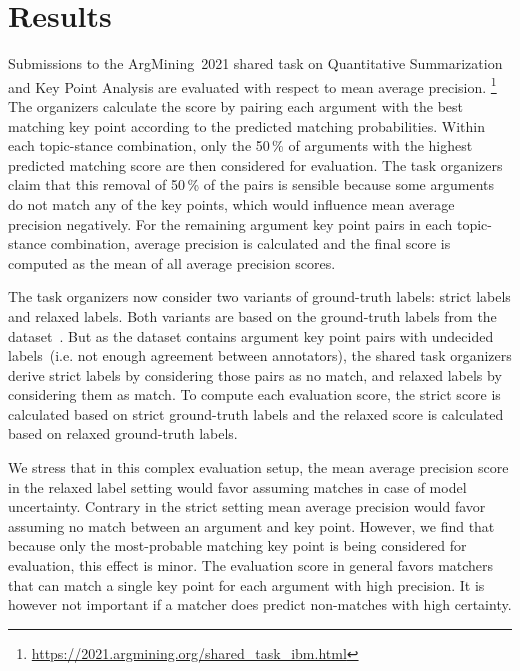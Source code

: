 \section{Results}\label{results}


Submissions to the ArgMining~2021 shared task on Quantitative Summarization and Key Point Analysis are evaluated with respect to mean average precision.%
\footnote{\url{https://2021.argmining.org/shared_task_ibm.html}}
The organizers calculate the score by pairing each argument with the best matching key point according to the predicted matching probabilities.
Within each topic-stance combination, only the 50\,\% of arguments with the highest predicted matching score are then considered for evaluation.
The task organizers claim that this removal of 50\,\% of the pairs is sensible because some arguments do not match any of the key points, which would influence mean average precision negatively. %
For the remaining argument key point pairs in each topic-stance combination, average precision is calculated and the final score is computed as the mean of all average precision scores.

The task organizers now consider two variants of ground-truth labels: strict labels and relaxed labels.
Both variants are based on the ground-truth labels from the \ArgKP dataset~\cite{Bar-HaimEFKLS2020}. But as the \ArgKP dataset contains argument key point pairs with undecided labels~(i.e. not enough agreement between annotators), the shared task organizers derive strict labels by considering those pairs as no match, and relaxed labels by considering them as match. %
To compute each evaluation score, the strict score is calculated based on strict ground-truth labels and the relaxed score is calculated based on relaxed ground-truth labels. %

We stress that in this complex evaluation setup, the mean average precision score in the relaxed label setting would favor assuming matches in case of model uncertainty.
Contrary in the strict setting mean average precision would favor assuming no match between an argument and key point.
However, we find that because only the most-probable matching key point is being considered for evaluation, this effect is minor.
The evaluation score in general favors matchers that can match a single key point for each argument with high precision.
It is however not important if a matcher does predict non-matches with high certainty.

